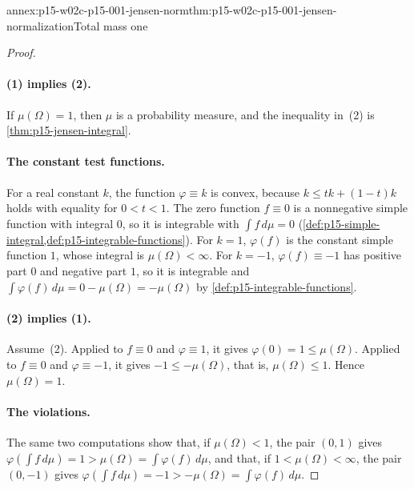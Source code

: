 \begin{annexitem}{annex:p15-w02c-p15-001-jensen-norm}{thm:p15-w02c-p15-001-jensen-normalization}{Total mass one}
\begin{proof}
\paragraph{(1) implies (2).}
If \(\mu(\Omega)=1\), then \(\mu\) is a probability measure, and the
inequality in~(2) is \cref{thm:p15-jensen-integral}.

\paragraph{The constant test functions.}
For a real constant \(k\), the function \(\varphi\equiv k\) is convex,
because \(k\leq tk+(1-t)k\) holds with equality for \(0<t<1\). The zero
function \(f\equiv0\) is a nonnegative simple function with integral
\(0\), so it is integrable with \(\int f\,d\mu=0\)
(\cref{def:p15-simple-integral,def:p15-integrable-functions}). For
\(k=1\), \(\varphi(f)\) is the constant simple function \(1\), whose
integral is \(\mu(\Omega)<\infty\). For \(k=-1\), \(\varphi(f)\equiv-1\)
has positive part \(0\) and negative part \(1\), so it is integrable and
\(\int\varphi(f)\,d\mu=0-\mu(\Omega)=-\mu(\Omega)\) by
\cref{def:p15-integrable-functions}.

\paragraph{(2) implies (1).}
Assume~(2). Applied to \(f\equiv0\) and \(\varphi\equiv1\), it gives
\(\varphi(0)=1\leq\mu(\Omega)\). Applied to \(f\equiv0\) and
\(\varphi\equiv-1\), it gives \(-1\leq-\mu(\Omega)\), that is,
\(\mu(\Omega)\leq1\). Hence \(\mu(\Omega)=1\).

\paragraph{The violations.}
The same two computations show that, if \(\mu(\Omega)<1\), the pair
\((0,1)\) gives \(\varphi(\int f\,d\mu)=1>\mu(\Omega)=\int\varphi(f)\,d\mu\),
and that, if \(1<\mu(\Omega)<\infty\), the pair \((0,-1)\) gives
\(\varphi(\int f\,d\mu)=-1>-\mu(\Omega)=\int\varphi(f)\,d\mu\).
\end{proof}
\end{annexitem}

